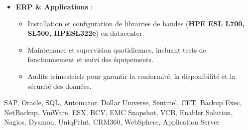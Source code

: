 \begin{experiences}
{\begin{itemize}[left=0pt,label={},itemsep=0.5em]
          \vspace{0.3em}

          \item \textbf{ERP \& Applications} :
            \begin{itemize}[itemsep=0.2em,topsep=0.2em,parsep=0pt]
              \small
              \item Installation et configuration de librairies de bandes (\textbf{HPE ESL L700, SL500, HPESL322e}) en datacenter.  
              \item Maintenance et supervision quotidiennes, incluant tests de fonctionnement et suivi des équipements.  
              \item Audits trimestriels pour garantir la conformité, la disponibilité et la sécurité des données.
            \end{itemize}
        \end{itemize}
        \vspace{0.3em}
    }
    {SAP, Oracle, SQL, Automator, Dollar Universe, Sentinel, CFT, Backup Exec, NetBackup, VmWare, ESX, BCV, EMC Snapshot, VCB, Enabler Solution, Nagios, Dyamon, UniqPrint, CRM360, WebSphere, Application Server}

\emptySeparator
\end{experiences}